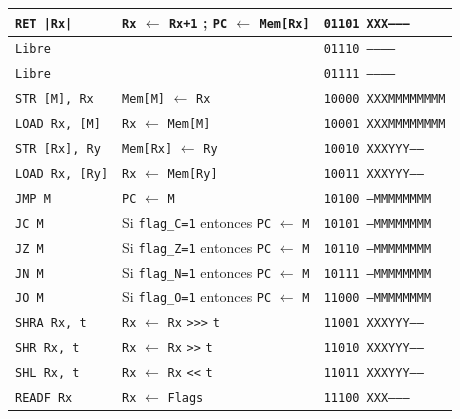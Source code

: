 \documentclass[a4paper,11pt]{article}
\begin{document}
\begin{center}
\begin{tabular}{l|l|l}
\texttt{RET  |Rx|}     & \texttt{Rx} $\leftarrow$ \texttt{Rx+1} ; \texttt{PC} $\leftarrow$ \texttt{Mem[Rx]}    & \texttt{01101 XXX--------} \\  %
\hline
\texttt{Libre}         &                                                                    & \texttt{01110 -----------} \\  %
\texttt{Libre}         &                                                                    & \texttt{01111 -----------} \\  %
\hline
\texttt{STR  [M], Rx}  & \texttt{Mem[M]} $\leftarrow$ \texttt{Rx}                           & \texttt{10000 XXXMMMMMMMM} \\  %
\texttt{LOAD Rx, [M]}  & \texttt{Rx} $\leftarrow$ \texttt{Mem[M]}                           & \texttt{10001 XXXMMMMMMMM} \\  %
\texttt{STR  [Rx], Ry} & \texttt{Mem[Rx]} $\leftarrow$ \texttt{Ry}                          & \texttt{10010 XXXYYY-----} \\  %
\texttt{LOAD Rx, [Ry]} & \texttt{Rx} $\leftarrow$ \texttt{Mem[Ry]}                          & \texttt{10011 XXXYYY-----} \\  %
\hline
\texttt{JMP M}         & \texttt{PC} $\leftarrow$ \texttt{M}                                & \texttt{10100 ---MMMMMMMM} \\  %
\texttt{JC M}          & Si \texttt{flag\_C=1} entonces \texttt{PC} $\leftarrow$ \texttt{M} & \texttt{10101 ---MMMMMMMM} \\  %
\texttt{JZ M}          & Si \texttt{flag\_Z=1} entonces \texttt{PC} $\leftarrow$ \texttt{M} & \texttt{10110 ---MMMMMMMM} \\  %
\texttt{JN M}          & Si \texttt{flag\_N=1} entonces \texttt{PC} $\leftarrow$ \texttt{M} & \texttt{10111 ---MMMMMMMM} \\  %
\texttt{JO M}          & Si \texttt{flag\_O=1} entonces \texttt{PC} $\leftarrow$ \texttt{M} & \texttt{11000 ---MMMMMMMM} \\  %
\hline
\texttt{SHRA Rx, t}    & \texttt{Rx} $\leftarrow$ \texttt{Rx} \verb|>>>| \texttt{t}         & \texttt{11001 XXXYYY-----} \\  %
\texttt{SHR Rx, t}     & \texttt{Rx} $\leftarrow$ \texttt{Rx} \verb|>>| \texttt{t}          & \texttt{11010 XXXYYY-----} \\  %
\texttt{SHL Rx, t}     & \texttt{Rx} $\leftarrow$ \texttt{Rx} \verb|<<| \texttt{t}          & \texttt{11011 XXXYYY-----} \\  %
\hline
\texttt{READF Rx}      & \texttt{Rx}    $\leftarrow$ \texttt{Flags}                         & \texttt{11100 XXX--------} \\  %

\end{tabular}
\end{center}
\end{document}
